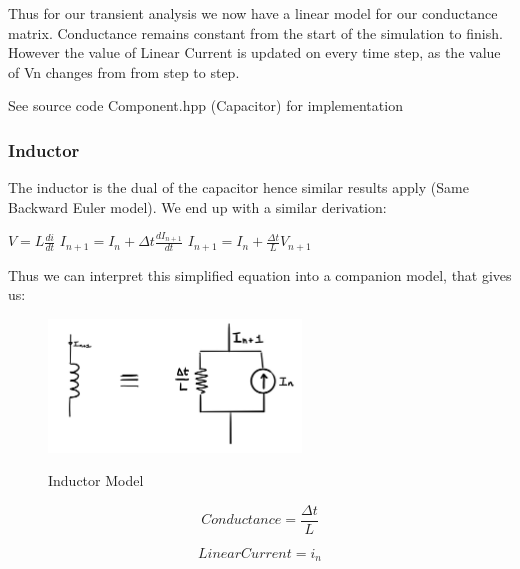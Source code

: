 \documentclass{article}
\begin{document}
\bigbreak 

Thus for our transient analysis we now have a linear model for our conductance matrix. Conductance remains constant from the start of the simulation to finish. However the value of Linear Current is updated on every time step, as the value of Vn changes from from step to step.

See source code Component.hpp (Capacitor) for implementation
\bigbreak 

\subsubsection{Inductor}
The inductor is the dual of the capacitor hence similar results apply (Same Backward Euler model). We end up with a similar derivation:
\bigbreak

$V = L\frac{di}{dt}$
\medbreak
$I_{n+1} = I_n + \Delta t\frac{dI_{n+1}}{dt}$
\medbreak
$I_{n+1} = I_n + \frac{\Delta t}{L}V_{n+1}$

\bigbreak

Thus we can interpret this simplified equation into a companion model, that gives us: 

\bigbreak

\begin{figure}[h]
    \caption{Inductor Model}
    \centering
    \includegraphics[width=0.6\textwidth]{images/InductorModel.jpg}
    \label{fig:InductorModel}
\end{figure}

\noindent\begin{minipage}{.5\linewidth}
\setcounter{equation}{0}
\begin{equation}
  Conductance = \frac{\Delta t}{L}
\end{equation}
\end{minipage}%
\begin{minipage}{.5\linewidth}
\begin{equation}
  LinearCurrent = i_n
\end{equation}
\end{minipage}

\bigbreak
\end{document}
